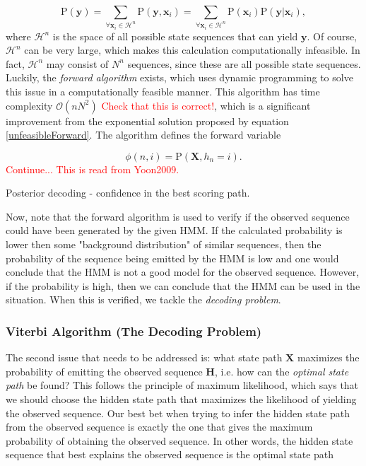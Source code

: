 \documentclass{article}
\begin{document}
\begin{equation}
    \text{P}(\textbf{y}) = \sum_{\forall\textbf{x}_i \in \mathcal{H}^n} \text{P}(\textbf{y}, \textbf{x}_i) = \sum_{\forall\textbf{x}_i \in \mathcal{H}^n} \text{P}(\mathbf{x}_i)\text{P}(\mathbf{y}|\mathbf{x}_i), 
\label{unfeasibleForward}
\end{equation}
where $\mathcal{H}^n$ is the space of all possible state sequences that can yield $\mathbf{y}$. Of course, $\mathcal{H}^n$ can be very large, which makes this calculation computationally infeasible. In fact, $\mathcal{H}^n$ may consist of $N^n$ sequences, since these are all possible state sequences. Luckily, the \textit{forward algorithm} exists, which uses dynamic programming to solve this issue in a computationally feasible manner. This algorithm has time complexity $\mathcal{O}(nN^2)$ \textcolor{red}{Check that this is correct!}, which is a significant improvement from the exponential solution proposed by equation \eqref{unfeasibleForward}. The algorithm defines the forward variable 

\begin{equation}
\phi(n,i) = \text{P}(\textbf{X}, h_n = i).
\label{ForwardVariable}
\end{equation}
\textcolor{red}{Continue... This is read from Yoon2009.}

Posterior decoding - confidence in the best scoring path.

Now, note that the forward algorithm is used to verify if the observed sequence could have been generated by the given HMM. If the calculated probability is lower then some "background distribution" of similar sequences, then the probability of the sequence being emitted by the HMM is low and one would conclude that the HMM is not a good model for the observed sequence. However, if the probability is high, then we can conclude that the HMM can be used in the situation. When this is verified, we tackle the \textit{decoding problem}.

\subsubsection{Viterbi Algorithm (The Decoding Problem)}
The second issue that needs to be addressed is: what state path $\mathbf{X}$ maximizes the probability of emitting the observed sequence $\mathbf{H}$, i.e. how can the \textit{optimal state path} be found? This follows the principle of maximum likelihood, which says that we should choose the hidden state path that maximizes the likelihood of yielding the observed sequence. Our best bet when trying to infer the hidden state path from the observed sequence is exactly the one that gives the maximum probability of obtaining the observed sequence. In other words, the hidden state sequence that best explains the observed sequence is the optimal state path
\end{document}
